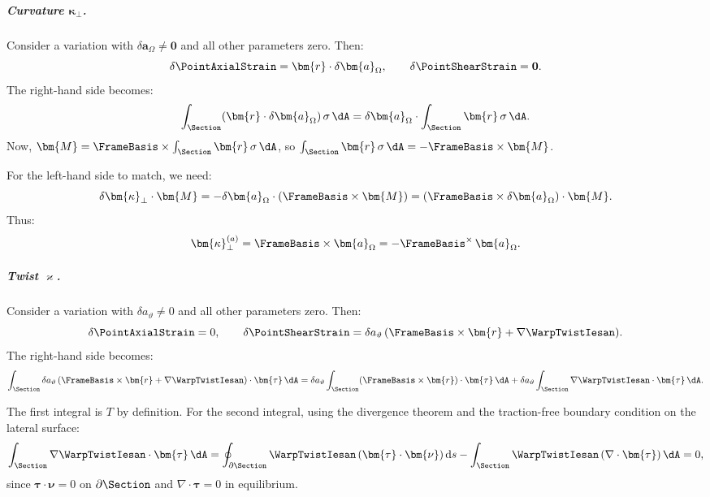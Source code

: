 \subparagraph{Curvature $\bm{\kappa}_\perp$.}

Consider a variation with $\delta\bm{a}_\Omega \neq \mathbf{0}$ and all other parameters zero. Then:
\begin{equation*}
\delta\PointAxialStrain = \bm{r} \cdot \delta\bm{a}_\Omega, \qquad \delta\PointShearStrain = \mathbf{0}.
\end{equation*}
The right-hand side becomes:
\begin{equation*}
\int_\Section (\bm{r} \cdot \delta\bm{a}_\Omega)\,\sigma \, \dA 
= \delta\bm{a}_\Omega \cdot \int_\Section \bm{r}\,\sigma \, \dA.
\end{equation*}
Now, $\bm{M} = \FrameBasis \times \int_\Section \bm{r}\,\sigma \, \dA$, so 
$\int_\Section \bm{r}\,\sigma \, \dA = -\FrameBasis \times \bm{M}$.

For the left-hand side to match, we need:
\begin{equation*}
\delta\bm{\kappa}_\perp \cdot \bm{M} = -\delta\bm{a}_\Omega \cdot (\FrameBasis \times \bm{M}) 
= (\FrameBasis \times \delta\bm{a}_\Omega) \cdot \bm{M}.
\end{equation*}
Thus:
\begin{equation*}
\bm{\kappa}_\perp^{(a)} = \FrameBasis \times \bm{a}_\Omega = -\FrameBasis^\times\,\bm{a}_\Omega.
\end{equation*}

\subparagraph{Twist $\varkappa$.}

Consider a variation with $\delta a_\vartheta \neq 0$ and all other parameters zero. Then:
\begin{equation*}
\delta\PointAxialStrain = 0, \qquad 
\delta\PointShearStrain = \delta a_\vartheta\,(\FrameBasis \times \bm{r} + \nabla\WarpTwistIesan).
\end{equation*}
The right-hand side becomes:
\begin{equation*}
\int_\Section \delta a_\vartheta\,(\FrameBasis \times \bm{r} + \nabla\WarpTwistIesan) \cdot \bm{\tau} \, \dA 
= \delta a_\vartheta \int_\Section (\FrameBasis \times \bm{r}) \cdot \bm{\tau} \, \dA 
+ \delta a_\vartheta \int_\Section \nabla\WarpTwistIesan \cdot \bm{\tau} \, \dA.
\end{equation*}

The first integral is $T$ by definition. For the second integral, using the 
divergence theorem and the traction-free boundary condition on the lateral surface:
\begin{equation*}
\int_\Section \nabla\WarpTwistIesan \cdot \bm{\tau} \, \dA 
= \oint_{\partial\Section} \WarpTwistIesan\,(\bm{\tau} \cdot \bm{\nu}) \, \mathrm{d}s 
- \int_\Section \WarpTwistIesan\,(\nabla \cdot \bm{\tau}) \, \dA = 0,
\end{equation*}
since $\bm{\tau} \cdot \bm{\nu} = 0$ on $\partial\Section$ and $\nabla \cdot \bm{\tau} = 0$ 
in equilibrium.

